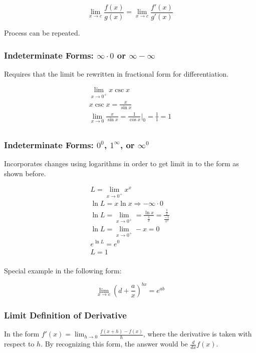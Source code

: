 \[\lim_{x\to{c}}\frac{f(x)}{g(x)}=\lim_{x\to{c}}\frac{f'(x)}{g'(x)}\]

Process can be repeated.

\subsubsection{Indeterminate Forms: $\infty \cdot 0$ or $\infty - \infty$}

Requires that the limit be rewritten in fractional form for differentiation.

\begin{gather*}
    \lim_{x\to{0^+}}x\csc{x}\\
    x\csc{x}=\frac{x}{\sin{x}}\\
    \lim_{x\to{0}}\frac{x}{\sin{x}}=\frac{1}{\cos{x}}|_{0}=\frac{1}{1}=1\\
\end{gather*}

\subsubsection{Indeterminate Forms: $0^0$, $1^\infty$, or $\infty^0$}

Incorporates changes using logarithms in order to get limit in to the form
as shown before. 

\begin{gather*}
    L=\lim_{x\to{0^+}}x^x\\
    \ln{L}=x\ln{x} \Rightarrow -\infty \cdot 0\\
    \ln{L}=\lim_{x\to{0^+}}=\frac{\ln{x}}{\frac{1}{x}}=\frac{\frac{1}{x}}{\frac{-1}{x^2}}\\
    \ln{L}=\lim_{x\to{0^+}}-x=0\\
    e^{\ln{L}}=e^0\\
    L=1\\
\end{gather*}

Special example in the following form:

\[\lim_{x\to{c}}(d+\frac{a}{x})^{bx}=e^{ab}\]

\subsubsection{Limit Definition of Derivative}

In the form $f'(x)=\lim_{h\to{0}}\frac{f(x+h)-f(x)}{h}$, 
where the derivative is taken with respect to $h$.
By recognizing this form, the answer would be $\frac{d}{dx}f(x)$.